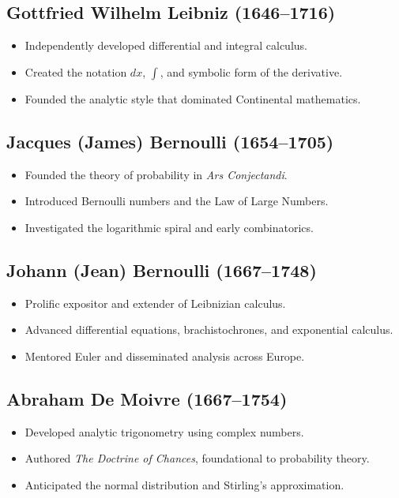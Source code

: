 \documentclass[9pt]{article}
\begin{document}
\subsection*{Gottfried Wilhelm Leibniz (1646–1716)}
\begin{itemize}
  \item Independently developed differential and integral calculus.
  \item Created the notation $dx$, $\int$, and symbolic form of the derivative.
  \item Founded the analytic style that dominated Continental mathematics.
\end{itemize}

\subsection*{Jacques (James) Bernoulli (1654–1705)}
\begin{itemize}
  \item Founded the theory of probability in \textit{Ars Conjectandi}.
  \item Introduced Bernoulli numbers and the Law of Large Numbers.
  \item Investigated the logarithmic spiral and early combinatorics.
\end{itemize}

\subsection*{Johann (Jean) Bernoulli (1667–1748)}
\begin{itemize}
  \item Prolific expositor and extender of Leibnizian calculus.
  \item Advanced differential equations, brachistochrones, and exponential calculus.
  \item Mentored Euler and disseminated analysis across Europe.
\end{itemize}

\subsection*{Abraham De Moivre (1667–1754)}
\begin{itemize}
  \item Developed analytic trigonometry using complex numbers.
  \item Authored \textit{The Doctrine of Chances}, foundational to probability theory.
  \item Anticipated the normal distribution and Stirling’s approximation.
\end{itemize}
\end{document}
